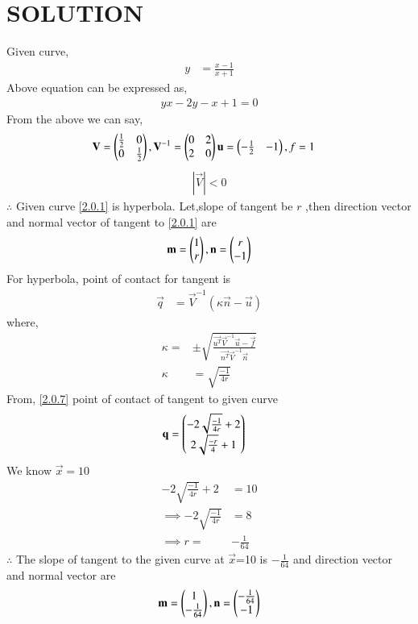 \documentclass[journal,12pt,twocolumn]{IEEEtran}
\begin{document}
\section{SOLUTION}
Given curve,
\begin{align}
y&=\frac{{x-1}}{{x+1}} \label{2.0.1}
\end{align}
Above equation can be expressed as,
\begin{align}
yx-2y-x+1 =0
\end{align}
From the above we can say,
\begin{align}
\mathbf{V}&=\begin{pmatrix}\frac{1}{2} & 0 \\ 0 & \frac{1}{2}\end{pmatrix},\mathbf{V}^{-1}=\begin{pmatrix}0&2\\2&0\end{pmatrix}\mathbf{u}=\begin{pmatrix}-\frac{1}{2}&-1\end{pmatrix},
 f =1
\end{align}
\begin{align}
 |\vec{V}| < 0
\end{align}
$\therefore $ Given curve \eqref{2.0.1} is hyperbola.
Let,slope of tangent be $r$ ,then direction vector and normal vector of tangent to \eqref{2.0.1} are
\begin{align}
    \mathbf{m}= \begin{pmatrix}1\\r\end{pmatrix},\mathbf{n}=\begin{pmatrix}r\\-1\end{pmatrix} \label{2.0.6}
\end{align}
For hyperbola, point of contact for tangent is
\begin{align}
\vec{q}&=\vec{V}^{-1}(\kappa\vec{n}-\vec{u})\label{2.0.7}
\end{align}
where,
\begin{align}
\kappa=&\pm \sqrt{\frac{\vec{u^T}\vec{V}^{-1}\vec{u}-\vec{f}}{\vec{n^T}\vec{V}^{-1}\vec{n}}}\\
\kappa&=\sqrt{\frac{-1}{4r}} \label{2.0.9}
\end{align}
From, \eqref{2.0.7} point of contact of tangent to given curve
\begin{align}
\mathbf{q} &= \begin{pmatrix}-2\sqrt{\frac{-1}{4r}}+2\\2\sqrt{\frac{-r}{4}}+1\end{pmatrix}\label{2.0.10}
\end{align}
We know $\vec{x}=10$
\begin{align}
-2\sqrt{\frac{-1}{4r}}+2 &= 10\\
\implies -2\sqrt{\frac{-1}{4r}}&=8\\
\implies r=&-\frac{1}{64}
\end{align}
$\therefore$  The slope of tangent to the given curve at $\vec{x}$=10 is
$-\frac{1}{64}$ and direction vector and normal vector are
\begin{align}
\mathbf{m}=\begin{pmatrix}1\\-\frac{1}{64}\end{pmatrix},\mathbf{n}=\begin{pmatrix}-\frac{1}{64}\\-1\end{pmatrix}
\end{align}
\end{document}
